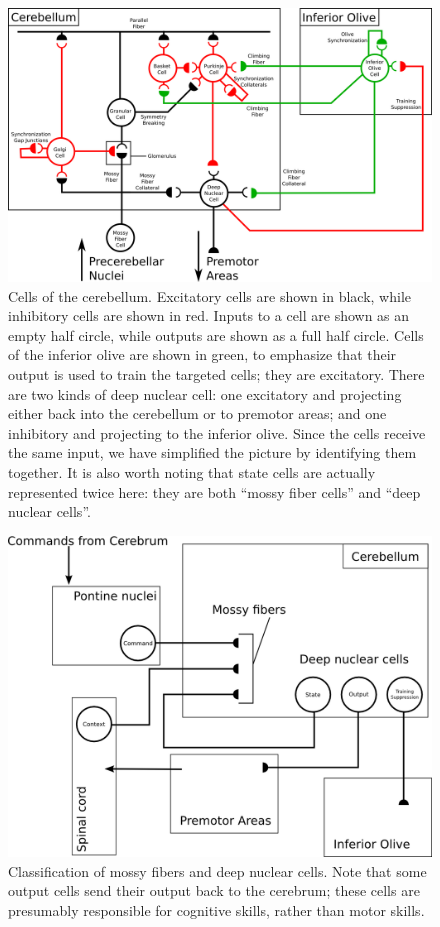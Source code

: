 \documentclass{article}
\theoremstyle{definition}
\begin{document}
\begin{figure}
\includegraphics[width=\linewidth]{cells.png}
\caption{Cells of the cerebellum. Excitatory cells are shown in black,
  while inhibitory cells are shown in red. Inputs to a cell are shown
  as an empty half circle, while outputs are shown as a full half
  circle.  Cells of the inferior olive are shown in green, to
  emphasize that their output is used to train the targeted cells;
  they are excitatory. There are two kinds of deep nuclear cell: one
  excitatory and projecting either back into the cerebellum or to
  premotor areas; and one inhibitory and projecting to the inferior
  olive. Since the cells receive the same input, we have simplified
  the picture by identifying them together. It is also worth noting
  that state cells are actually represented twice here: they are both
  ``mossy fiber cells'' and ``deep nuclear cells''.}
\label{fig-cells}
\end{figure}

\begin{figure}
\includegraphics[width=\linewidth]{classification.png}
\caption{Classification of mossy fibers and deep nuclear cells. Note
  that some output cells send their output back to the cerebrum; these
  cells are presumably responsible for cognitive skills, rather than
  motor skills.}
\label{fig-classification}
\end{figure}
\end{document}
